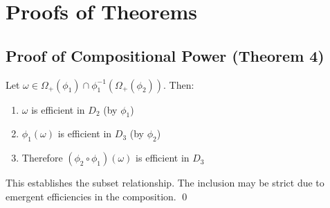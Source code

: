 \documentclass[12pt,a4paper]{article}
\theoremstyle{definition}
\begin{document}
\section{Proofs of Theorems}

\subsection{Proof of Compositional Power (Theorem 4)}

Let $\omega \in \Omega_+(\phi_1) \cap \phi_1^{-1}(\Omega_+(\phi_2))$. Then:
\begin{enumerate}
\item $\omega$ is efficient in $D_2$ (by $\phi_1$)
\item $\phi_1(\omega)$ is efficient in $D_3$ (by $\phi_2$)
\item Therefore $(\phi_2 \circ \phi_1)(\omega)$ is efficient in $D_3$
\end{enumerate}
This establishes the subset relationship. The inclusion may be strict due to emergent efficiencies in the composition. \qed
\end{document}
